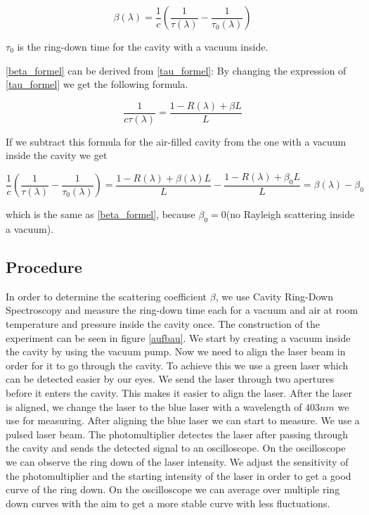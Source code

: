 \documentclass[10pt,a4paper]{article}
\begin{document}
\begin{equation}
\beta(\lambda) = \frac{1}{c} (\frac{1}{\tau(\lambda)} - \frac{1}{\tau_0(\lambda)})
\label{beta_formel}
\end{equation}

$\tau_0$ is the ring-down time for the cavity with a vacuum inside.

\ref{beta_formel} can be derived from \ref{tau_formel}: By changing the expression of \ref{tau_formel} we get the following formula.

\begin{equation}
\frac{1}{c \tau(\lambda)} = \frac{1-R(\lambda) + \beta L}{L}
\end{equation}



If we subtract this formula for the air-filled cavity from the one with a vacuum inside the cavity we get

\begin{equation}
\frac{1}{c}(\frac{1}{\tau(\lambda)} - \frac{1}{\tau_0(\lambda)}) = \frac{1 - R(\lambda) + \beta(\lambda) L}{L} - \frac{1 - R(\lambda) + \beta_0 L}{L} = \beta(\lambda) - \beta_0
\end{equation}  

which is the same as \ref{beta_formel}, because $\beta_0 = 0$(no Rayleigh scattering inside a vacuum).

\subsection{Procedure}

In order to determine the scattering coefficient $\beta$, we use Cavity Ring-Down Spectroscopy and measure the ring-down time each for a vacuum and air at room temperature and pressure inside the cavity once. The construction of the experiment can be seen in figure \ref{aufbau}.
We start by creating a vacuum inside the cavity by using the vacuum pump. Now we need to align the laser beam in order for it to go through the cavity. To achieve this we use a green laser which can be detected easier by our eyes. We send the laser through two apertures before it enters the cavity. This makes it easier to align the laser. After the laser is aligned, we change the laser to the blue laser with a wavelength of $403 nm$ we use for measuring. After aligning the blue laser we can start to measure. We use a pulsed laser beam. The photomultiplier detectes the laser after passing through the cavity and sends the detected signal to an oscilloscope. On the oscilloscope we can observe the ring down of the laser intensity. We adjust the sensitivity of the photomultiplier and the starting intensity of the laser in order to get a good curve of the ring down. On the oscilloscope we can average over multiple ring down curves with the aim to get a more stable curve with less fluctuations. 
\end{document}
